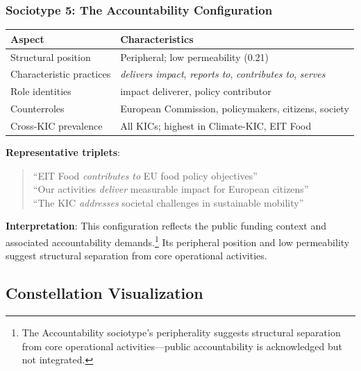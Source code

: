 \documentclass[../main.tex]{subfiles}
\begin{document}
\subsubsection{Sociotype 5: The Accountability Configuration}

\begin{center}
\small
\begin{tabular}{ll}
\toprule
\textbf{Aspect} & \textbf{Characteristics} \\
\midrule
Structural position & Peripheral; low permeability (0.21) \\
Characteristic practices & \textit{delivers impact}, \textit{reports to}, \textit{contributes to}, \textit{serves} \\
Role identities & impact deliverer, policy contributor \\
Counterroles & European Commission, policymakers, citizens, society \\
Cross-KIC prevalence & All KICs; highest in Climate-KIC, EIT Food \\
\bottomrule
\end{tabular}
\end{center}

\textbf{Representative triplets}:
\begin{quote}
\small
``EIT Food \textit{contributes to} EU food policy objectives''\\
``Our activities \textit{deliver} measurable impact for European citizens''\\
``The KIC \textit{addresses} societal challenges in sustainable mobility''
\end{quote}

\textbf{Interpretation}: This configuration reflects the public funding context and associated accountability demands.\footnote{The Accountability sociotype's peripherality suggests structural separation from core operational activities---public accountability is acknowledged but not integrated.} Its peripheral position and low permeability suggest structural separation from core operational activities.

\subsection{Constellation Visualization}
\end{document}
